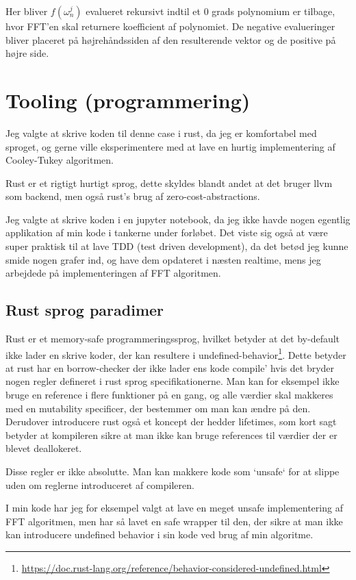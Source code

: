 \documentclass[11pt,a4paper]{article}
\begin{document}
Her bliver \(f(\omega_n^j)\) evalueret rekursivt indtil et 0 grads polynomium er tilbage, hvor FFT'en skal returnere koefficient af polynomiet.
De negative evalueringer bliver placeret på højrehåndssiden af den resulterende vektor og de positive på højre side.

\section{Tooling (programmering)}
\label{sec:org7e23960}
Jeg valgte at skrive koden til denne case i rust, da jeg er komfortabel med sproget,
og gerne ville eksperimentere med at lave en hurtig implementering af Cooley-Tukey algoritmen.

Rust er et rigtigt hurtigt sprog, dette skyldes blandt andet at det bruger llvm som backend,
men også rust's brug af zero-cost-abstractions.

Jeg valgte at skrive koden i en jupyter notebook, da jeg ikke havde nogen egentlig
applikation af min kode i tankerne under forløbet.
Det viste sig også at være super praktisk til at lave TDD (test driven development),
da det betød jeg kunne smide nogen grafer ind, og have dem opdateret i næsten realtime,
mens jeg arbejdede på implementeringen af FFT algoritmen.

\subsection{Rust sprog paradimer}
\label{sec:orgb752978}
Rust er et memory-safe programmeringssprog,
hvilket betyder at det by-default ikke lader en skrive koder, der kan resultere i undefined-behavior\footnote{\url{https://doc.rust-lang.org/reference/behavior-considered-undefined.html}}.
Dette betyder at rust har en borrow-checker der ikke lader ens kode compile' hvis det bryder nogen regler defineret i rust sprog specifikationerne.
Man kan for eksempel ikke bruge en reference i flere funktioner på en gang, og alle værdier skal makkeres med
en mutability specificer, der bestemmer om man kan ændre på den. Derudover introducere rust også et koncept der hedder lifetimes,
som kort sagt betyder at kompileren sikre at man ikke kan bruge references til værdier der er blevet deallokeret.

\bigskip

Disse regler er ikke absolutte. Man kan makkere kode som `unsafe` for at slippe uden om reglerne introduceret af compileren.

I min kode har jeg for eksempel valgt at lave en meget unsafe implementering af FFT algoritmen,
men har så lavet en safe wrapper til den, der sikre at man ikke kan introducere undefined behavior i sin kode ved brug af min algoritme.
\end{document}
